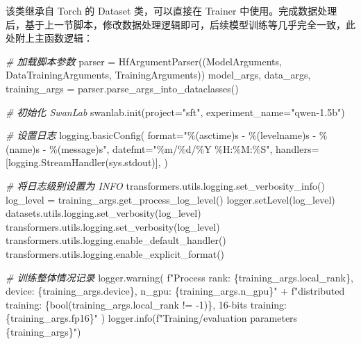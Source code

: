 \documentclass[
]{article}
\newenvironment{Shaded}{}{}
\newcommand{\BuiltInTok}[1]{\textcolor[rgb]{0.00,0.50,0.00}{#1}}
\newcommand{\CommentTok}[1]{\textcolor[rgb]{0.38,0.63,0.69}{\textit{#1}}}
\newcommand{\DecValTok}[1]{\textcolor[rgb]{0.25,0.63,0.44}{#1}}
\newcommand{\NormalTok}[1]{#1}
\newcommand{\OperatorTok}[1]{\textcolor[rgb]{0.40,0.40,0.40}{#1}}
\newcommand{\SpecialCharTok}[1]{\textcolor[rgb]{0.25,0.44,0.63}{#1}}
\newcommand{\SpecialStringTok}[1]{\textcolor[rgb]{0.73,0.40,0.53}{#1}}
\newcommand{\StringTok}[1]{\textcolor[rgb]{0.25,0.44,0.63}{#1}}
\begin{document}
该类继承自 Torch 的 Dataset 类，可以直接在 Trainer
中使用。完成数据处理后，基于上一节脚本，修改数据处理逻辑即可，后续模型训练等几乎完全一致，此处附上主函数逻辑：

\begin{Shaded}
\begin{Highlighting}[]
\CommentTok{\# 加载脚本参数}
\NormalTok{parser }\OperatorTok{=}\NormalTok{ HfArgumentParser((ModelArguments, DataTrainingArguments, TrainingArguments))}
\NormalTok{model\_args, data\_args, training\_args }\OperatorTok{=}\NormalTok{ parser.parse\_args\_into\_dataclasses()}

\CommentTok{\# 初始化 SwanLab}
\NormalTok{swanlab.init(project}\OperatorTok{=}\StringTok{"sft"}\NormalTok{, experiment\_name}\OperatorTok{=}\StringTok{"qwen{-}1.5b"}\NormalTok{)}

\CommentTok{\# 设置日志}
\NormalTok{logging.basicConfig(}
    \BuiltInTok{format}\OperatorTok{=}\StringTok{"}\SpecialCharTok{\%(asctime)s}\StringTok{ {-} }\SpecialCharTok{\%(levelname)s}\StringTok{ {-} }\SpecialCharTok{\%(name)s}\StringTok{ {-} }\SpecialCharTok{\%(message)s}\StringTok{"}\NormalTok{,}
\NormalTok{    datefmt}\OperatorTok{=}\StringTok{"\%m/}\SpecialCharTok{\%d}\StringTok{/\%Y \%H:\%M:\%S"}\NormalTok{,}
\NormalTok{    handlers}\OperatorTok{=}\NormalTok{[logging.StreamHandler(sys.stdout)],}
\NormalTok{)}

\CommentTok{\# 将日志级别设置为 INFO}
\NormalTok{transformers.utils.logging.set\_verbosity\_info()}
\NormalTok{log\_level }\OperatorTok{=}\NormalTok{ training\_args.get\_process\_log\_level()}
\NormalTok{logger.setLevel(log\_level)}
\NormalTok{datasets.utils.logging.set\_verbosity(log\_level)}
\NormalTok{transformers.utils.logging.set\_verbosity(log\_level)}
\NormalTok{transformers.utils.logging.enable\_default\_handler()}
\NormalTok{transformers.utils.logging.enable\_explicit\_format()}

\CommentTok{\# 训练整体情况记录}
\NormalTok{logger.warning(}
    \SpecialStringTok{f"Process rank: }\SpecialCharTok{\{}\NormalTok{training\_args}\SpecialCharTok{.}\NormalTok{local\_rank}\SpecialCharTok{\}}\SpecialStringTok{, device: }\SpecialCharTok{\{}\NormalTok{training\_args}\SpecialCharTok{.}\NormalTok{device}\SpecialCharTok{\}}\SpecialStringTok{, n\_gpu: }\SpecialCharTok{\{}\NormalTok{training\_args}\SpecialCharTok{.}\NormalTok{n\_gpu}\SpecialCharTok{\}}\SpecialStringTok{"}
    \OperatorTok{+} \SpecialStringTok{f"distributed training: }\SpecialCharTok{\{}\BuiltInTok{bool}\NormalTok{(training\_args.local\_rank }\OperatorTok{!=} \OperatorTok{{-}}\DecValTok{1}\NormalTok{)}\SpecialCharTok{\}}\SpecialStringTok{, 16{-}bits training: }\SpecialCharTok{\{}\NormalTok{training\_args}\SpecialCharTok{.}\NormalTok{fp16}\SpecialCharTok{\}}\SpecialStringTok{"}
\NormalTok{)}
\NormalTok{logger.info(}\SpecialStringTok{f"Training/evaluation parameters }\SpecialCharTok{\{}\NormalTok{training\_args}\SpecialCharTok{\}}\SpecialStringTok{"}\NormalTok{)}


\end{Highlighting}
\end{Shaded}
\end{document}
